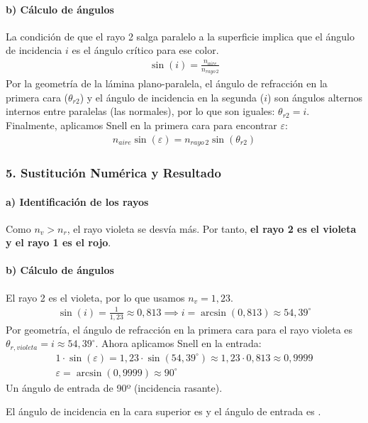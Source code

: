 \paragraph*{b) Cálculo de ángulos}
La condición de que el rayo 2 salga paralelo a la superficie implica que el ángulo de incidencia $i$ es el ángulo crítico para ese color.
\begin{gather}
    \sin(i) = \frac{n_{aire}}{n_{rayo \, 2}}
\end{gather}
Por la geometría de la lámina plano-paralela, el ángulo de refracción en la primera cara ($\theta_{r2}$) y el ángulo de incidencia en la segunda ($i$) son ángulos alternos internos entre paralelas (las normales), por lo que son iguales: $\theta_{r2}=i$.
Finalmente, aplicamos Snell en la primera cara para encontrar $\varepsilon$:
\begin{gather}
    n_{aire} \sin(\varepsilon) = n_{rayo \, 2} \sin(\theta_{r2})
\end{gather}

\subsubsection*{5. Sustitución Numérica y Resultado}
\paragraph*{a) Identificación de los rayos}
Como $n_v > n_r$, el rayo violeta se desvía más. Por tanto, \textbf{el rayo 2 es el violeta y el rayo 1 es el rojo}.

\paragraph*{b) Cálculo de ángulos}
El rayo 2 es el violeta, por lo que usamos $n_v=1,23$.
\begin{gather}
    \sin(i) = \frac{1}{1,23} \approx 0,813 \implies i = \arcsin(0,813) \approx 54,39^\circ
\end{gather}
Por geometría, el ángulo de refracción en la primera cara para el rayo violeta es $\theta_{r,violeta} = i \approx 54,39^\circ$.
Ahora aplicamos Snell en la entrada:
\begin{gather}
    1 \cdot \sin(\varepsilon) = 1,23 \cdot \sin(54,39^\circ) \approx 1,23 \cdot 0,813 \approx 0,9999 \\
    \varepsilon = \arcsin(0,9999) \approx 90^\circ
\end{gather}
Un ángulo de entrada de 90º (incidencia rasante).
\begin{cajaresultado}
    El ángulo de incidencia en la cara superior es  y el ángulo de entrada es .
\end{cajaresultado}

